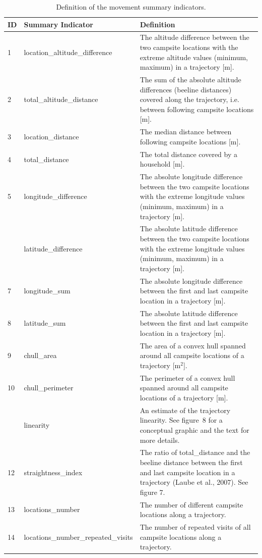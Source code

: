 \documentclass[]{elsarticle} %
\begin{document}
\begin{longtable}[t]{llp{23em}}
\caption{\label{tab:movement-summary-indicators-definition}Definition of the movement summary indicators. \label{tab:movement_summary_indicators_definition}}\\
\toprule
ID & Summary Indicator & Definition\\
\midrule
1 & location\_altitude\_difference & The altitude difference between the two campsite locations with the extreme altitude values (minimum, maximum) in a trajectory [m].\\
2 & total\_altitude\_distance & The sum of the absolute altitude differences (beeline distances) covered along the trajectory, i.e. between following campsite locations [m].\\
3 & location\_distance & The median distance between following campsite locations [m].\\
4 & total\_distance & The total distance covered by a household [m].\\
5 & longitude\_difference & The absolute longitude difference between the two campsite locations with the extreme longitude values (minimum, maximum) in a trajectory [m].\\
\addlinespace
6 & latitude\_difference & The absolute latitude difference between the two campsite locations with the extreme longitude values (minimum, maximum) in a trajectory [m].\\
7 & longitude\_sum & The absolute longitude difference between the first and last campsite location in a trajectory [m].\\
8 & latitude\_sum & The absolute latitude difference between the first and last campsite location in a trajectory [m].\\
9 & chull\_area & The area of a convex hull spanned around all campsite locations of a trajectory [m$^2$].\\
10 & chull\_perimeter & The perimeter of a convex hull spanned around all campsite locations of a trajectory [m].\\
\addlinespace
11 & linearity & An estimate of the trajectory linearity. See figure~8 for a conceptual graphic and the text for more details.\\
12 & straightness\_index & The ratio of total\_distance and the beeline distance between the first and last campsite location in a trajectory (Laube et al., 2007). See figure 7.\\
13 & locations\_number & The number of different campsite locations along a trajectory.\\
14 & locations\_number\_repeated\_visits & The number of repeated visits of all campsite locations along a trajectory.\\
\bottomrule
\end{longtable}
\endgroup{}
\end{document}
